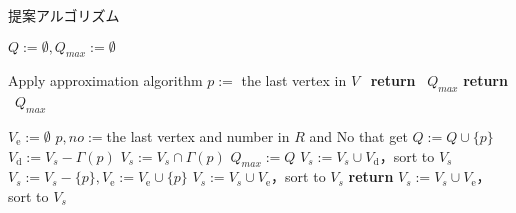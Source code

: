 \begin{algorithm}[p]
	\caption{提案アルゴリズム}
	\small
	\label{alg:proposal}
	\begin{algorithmic}[1]
		\State $Q:=\emptyset , Q_{max} := \emptyset$
		\State {}

		\State Apply approximation algorithm
			\State $p:=$ the last vertex in $V$
				\State {}
			\Else \ \textbf{return} \ $Q_{max}$
			\EndIf
		\EndWhile
		\State \textbf{return} \ $Q_{max}$
	\EndProcedure
    \end{algorithmic}
    

	\begin{algorithmic}[1]
			\State $V_\mathrm{e} := \emptyset $ 
				\State ${p,no} := $the last vertex and number in $R$ and $\mathrm{No}$ that get 
					\State $ Q := Q \cup \{ p \}$
					\State $ V_\mathrm{d} :=  V_s - \Gamma(p)$ 
					\State $ V_s := V_s \cap \Gamma(p)$
						\State {}
						\State $Q_{max} := Q$
					\EndIf
					\State $ V_s := V_s \cup V_\mathrm{d}$，sort to $V_s$ 
					\State $V_s:=V_s-\{p \} , V_\mathrm{e} := V_\mathrm{e} \cup \{ p\}$
	    			\Else
					\State $V_s:= V_s \cup V_\mathrm{e}$，sort to $V_s$ 
					\State \textbf{ return }
				\EndIf
			\EndWhile
			\State $V_s := V_s \cup V_\mathrm{e}$，sort to $V_s$ 

		\EndProcedure
		
	\end{algorithmic}
\end{algorithm}

